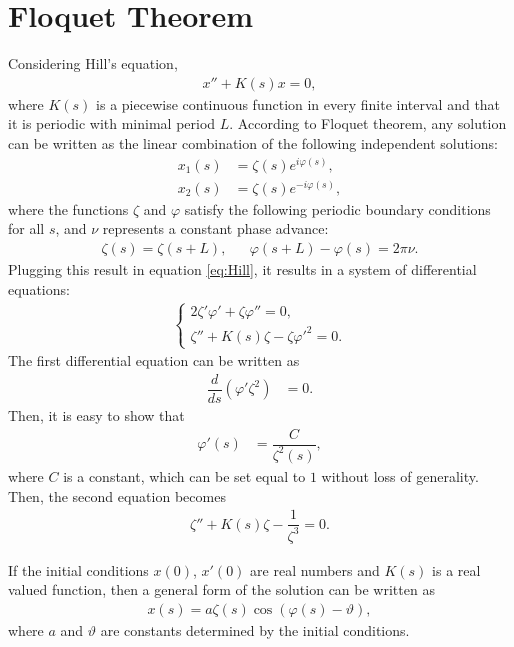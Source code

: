 \documentclass[../sands-adaptation.tex]{subfiles}
\begin{document}
\section{Floquet Theorem} \label{sec:FloquetTheorem}

Considering Hill's equation,
\begin{align}\label{eq:Hill}
	x''+K(s)x=0,
\end{align}
where $K(s)$ is a piecewise continuous function in every finite interval and that it is periodic with minimal period $L$. According to Floquet theorem, any solution can be written as the linear combination of the following independent solutions:
\begin{align*}
	x_1(s) &= \zeta(s) e^{i \varphi(s)}, \\
	x_2(s) &= \zeta(s) e^{-i \varphi(s)},
\end{align*}
where the functions $\zeta$ and $\varphi$ satisfy the following periodic boundary conditions for all $s$, and $\nu$ represents a constant phase advance:
\begin{align*}
	\zeta(s) = \zeta(s+L), && \varphi(s+L)-\varphi(s) = 2\pi \nu.
\end{align*}
Plugging this result in equation \eqref{eq:Hill}, it results in a system of differential equations:
\begin{align*}
	\begin{cases}
		2 \zeta' \varphi' + \zeta \varphi'' = 0, \\
		\zeta'' + K(s)\zeta - \zeta \varphi'^2 = 0.
	\end{cases}
\end{align*}
The first differential equation can be written as
\begin{align*}
	\dfrac{d}{ds}( \varphi' \zeta^2 ) &= 0.
\end{align*}
Then, it is easy to show that
\begin{align}
	\varphi'(s) &= \dfrac{C}{\zeta^2(s)},
\end{align}
where $C$ is a constant, which can be set equal to $1$ without loss of generality.
Then, the second equation becomes
\begin{align}
	\zeta'' + K(s) \zeta - \dfrac{1}{\zeta^3}=0.
\end{align}

If the initial conditions $x(0)$, $x'(0)$ are real numbers and $K(s)$ is a real valued function, then a general form of the solution can be written as
\begin{align}
	x(s) = a \zeta(s) \cos(\varphi(s) - \vartheta),
\end{align}
where $a$ and $\vartheta$ are constants determined by the initial conditions.
\end{document}
